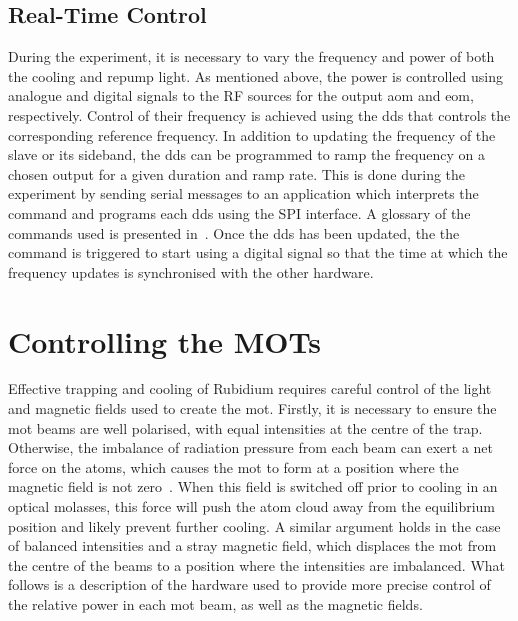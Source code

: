 \subsection{Real-Time Control} \label{subsec:muquans_comm}
During the experiment, it is necessary to vary the frequency and power of both
the cooling and repump light. As mentioned above, the power is controlled using
analogue and digital signals to the RF sources for the output \ac{aom} and
\ac{eom}, respectively. Control of their frequency is achieved using the
\ac{dds} that controls the corresponding reference frequency. In addition to
updating the frequency of the slave or its sideband, the \ac{dds} can be
programmed to ramp the frequency on a chosen output for a given duration and
ramp rate. This is done during the experiment by sending serial messages to an
application which interprets the command and programs each \ac{dds} using the
SPI interface. A glossary of the commands used is presented
in~. Once the \ac{dds} has been updated, the
the command is triggered to start using a digital signal so that the time at
which the frequency updates is synchronised with the other hardware.

\section{Controlling the MOTs}\label{sec:mot_control}
Effective trapping and cooling of Rubidium requires careful control of the light
and magnetic fields used to create the \ac{mot}. Firstly, it is necessary to
ensure the \ac{mot} beams are well polarised, with equal intensities at the
centre of the trap.  Otherwise, the imbalance of radiation pressure from each
beam can exert a net force on the atoms, which causes the \ac{mot} to form at a
position where the magnetic field is not zero~\cite{Steane1992}. When this field
is switched off prior to cooling in an optical molasses, this force will push
the atom cloud away from the equilibrium position and likely prevent further
cooling. A similar argument holds in the case of balanced intensities and a
stray magnetic field, which displaces the \ac{mot} from the centre of the beams
to a position where the intensities are imbalanced. What follows is a
description of the hardware used to provide more precise control of the relative
power in each \ac{mot} beam, as well as the magnetic fields.
